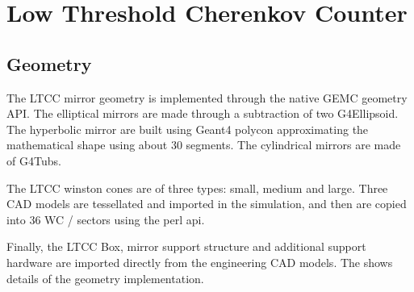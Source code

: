 \section{Low Threshold Cherenkov Counter}

\subsection{Geometry}
The LTCC mirror geometry is implemented through the native GEMC geometry API. The elliptical mirrors are made through a subtraction of
two G4Ellipsoid. The hyperbolic mirror are built using Geant4 polycon approximating the mathematical shape using about 30 segments.
The cylindrical mirrors are made of G4Tubs.

The LTCC winston cones are of three types: small, medium and large. Three CAD models are tessellated and imported in the simulation, and
then are copied into 36 WC / sectors using the perl api.

Finally, the LTCC Box, mirror support structure and additional support hardware are imported directly from the engineering CAD models.
The  shows details of the geometry implementation.

